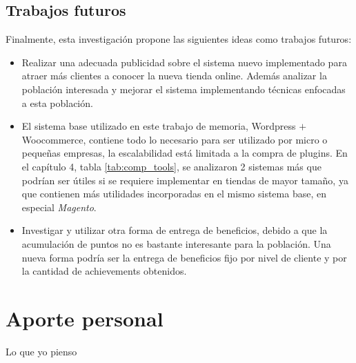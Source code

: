 \subsection{Trabajos futuros}

Finalmente, esta investigación propone las siguientes ideas como trabajos futuros:


\begin{itemize}

\item Realizar una adecuada publicidad sobre el sistema nuevo implementado para
	atraer más clientes a conocer la nueva tienda online. Además analizar
	la población interesada y mejorar el sistema implementando técnicas 
	enfocadas a esta población.

\item El sistema base utilizado en este trabajo de memoria, Wordpress $+$ Woocommerce, contiene
todo lo necesario para ser utilizado por micro o pequeñas empresas, la escalabilidad está limitada
a la compra de plugins. En el capítulo 4, tabla \ref{tab:comp_tools}, se analizaron 2 sistemas más
que podrían ser útiles si se requiere implementar {\GAM} en tiendas de mayor tamaño, ya que contienen
más utilidades incorporadas en el mismo sistema base, en especial \emph{Magento}.

\item Investigar y utilizar otra forma de entrega de beneficios, debido a que la 
acumulación de puntos no es bastante interesante para la población. Una nueva forma podría ser la entrega 
de beneficios fijo por nivel de cliente y por la cantidad de achievements obtenidos.

\end{itemize}

\section{Aporte personal}

Lo que yo pienso
